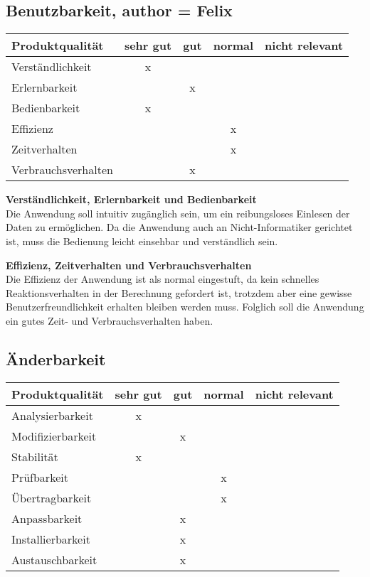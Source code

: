 \documentclass[parskip=full]{scrartcl} %
\begin{document}
\subsection{Benutzbarkeit, author = Felix}

    \begin{tabular}{|l| c| c| c| c|}
    \hline
        Produktqualität & sehr gut & gut & normal & nicht relevant \\
    \hline
        Verständlichkeit & x & & &\\
    \hline
        Erlernbarkeit & & x & &\\
    \hline
        Bedienbarkeit & x & & &\\
    \hline
        Effizienz & & & x &\\
    \hline
        Zeitverhalten & & & x &\\
    \hline
        Verbrauchsverhalten & & x & &\\
    \hline
    \end{tabular}

\textbf{Verständlichkeit, Erlernbarkeit und Bedienbarkeit}\\
Die Anwendung soll intuitiv zugänglich sein, um ein reibungsloses Einlesen der Daten zu ermöglichen. Da die Anwendung auch an Nicht-Informatiker gerichtet ist, muss die Bedienung leicht einsehbar und verständlich sein.

\textbf{Effizienz, Zeitverhalten und Verbrauchsverhalten}\\
Die Effizienz der Anwendung ist als normal eingestuft, da kein schnelles Reaktionsverhalten in der Berechnung gefordert ist, trotzdem aber eine gewisse Benutzerfreundlichkeit erhalten bleiben werden muss. Folglich soll die Anwendung ein gutes Zeit- und Verbrauchsverhalten haben.

\subsection{Änderbarkeit}
    \begin{tabular}{|l| c| c| c| c|}
    \hline
        Produktqualität & sehr gut & gut & normal & nicht relevant \\
    \hline
        Analysierbarkeit & x & & &\\
    \hline
        Modifizierbarkeit & & x & &\\
    \hline
        Stabilität & x & & &\\
    \hline
        Prüfbarkeit & & & x &\\
    \hline
        Übertragbarkeit & & & x &\\
    \hline
        Anpassbarkeit & & x & &\\
    \hline
        Installierbarkeit & & x & &\\
    \hline
        Austauschbarkeit & & x & &\\
    \hline
    \end{tabular}
    
\end{document}
